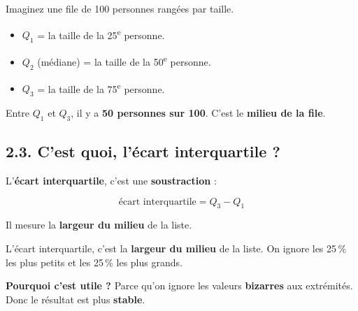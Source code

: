 \documentclass[12pt,a4paper]{article}
\begin{document}
\begin{enclair}
Imaginez une file de 100 personnes rangées par taille.

\vspace{0.2cm}
\begin{itemize}[leftmargin=*]
  \item $Q_1$ = la taille de la 25\textsuperscript{e} personne.
  \item $Q_2$ (médiane) = la taille de la 50\textsuperscript{e} personne.
  \item $Q_3$ = la taille de la 75\textsuperscript{e} personne.
\end{itemize}

\vspace{0.2cm}
Entre $Q_1$ et $Q_3$, il y a \textbf{50 personnes sur 100}. C'est le \textbf{milieu de la file}.
\end{enclair}

\subsection*{2.3. C'est quoi, l'écart interquartile ?}

\begin{rappel}
L'\textbf{écart interquartile}, c'est une \textbf{soustraction} :

\[
\text{écart interquartile} = Q_3 - Q_1
\]

\vspace{0.2cm}
Il mesure la \textbf{largeur du milieu} de la liste.
\end{rappel}

\begin{enclair}
L'écart interquartile, c'est la \textbf{largeur du milieu} de la liste. On ignore les 25\,\% les plus petits et les 25\,\% les plus grands.

\vspace{0.2cm}
\textbf{Pourquoi c'est utile ?} Parce qu'on ignore les valeurs \textbf{bizarres} aux extrémités. Donc le résultat est plus \textbf{stable}.
\end{enclair}
\end{document}
